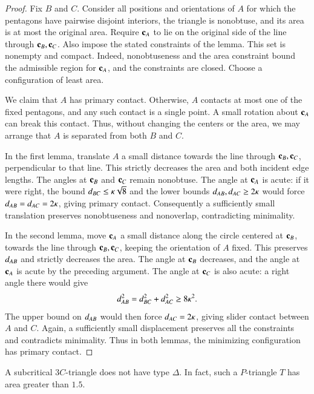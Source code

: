   \begin{proof}
Fix $B$ and $C$. Consider all positions and orientations of $A$
for which the pentagons have pairwise disjoint interiors, the
triangle is nonobtuse, and its area is at most the original area.
Require ${\mathbf c}_A$ to lie on the original side of the line through
${\mathbf c}_B,{\mathbf c}_C$. Also impose the stated constraints of the lemma.
This set is nonempty and compact. Indeed, nonobtuseness
and the area constraint bound the admissible region for ${\mathbf c}_A$,
and the constraints are closed. Choose a
configuration of least area.

We claim that $A$ has primary contact. Otherwise, $A$ contacts
at most one of the fixed pentagons, and any such contact is a
single point. A small rotation about ${\mathbf c}_A$ can break this
contact. Thus, without changing the centers or the area, we may arrange
that $A$ is separated from both $B$ and $C$.

In the first lemma, translate $A$ a small distance towards the
line through ${\mathbf c}_B,{\mathbf c}_C$, perpendicular to that line. This
strictly decreases the area and both incident edge lengths.
The angles at ${\mathbf c}_B$ and ${\mathbf c}_C$ remain nonobtuse. The angle at
${\mathbf c}_A$ is acute: if it were right, the bound
$d_{BC}\le\kappa\sqrt8$ and the lower bounds
$d_{AB},d_{AC}\ge2\kappa$ would force
$d_{AB}=d_{AC}=2\kappa$, giving primary contact.
Consequently a sufficiently small translation preserves
nonobtuseness and nonoverlap, contradicting minimality.

In the second lemma, move ${\mathbf c}_A$ a small distance along the
circle centered at ${\mathbf c}_B$, towards the line through
${\mathbf c}_B,{\mathbf c}_C$, keeping the orientation of $A$ fixed. This preserves
$d_{AB}$ and strictly decreases the area. The angle at ${\mathbf c}_B$
decreases, and the angle at ${\mathbf c}_A$ is acute by the preceding
argument. The angle at ${\mathbf c}_C$ is also acute: a right angle there
would give
\[
d_{AB}^2=d_{BC}^2+d_{AC}^2\ge8\kappa^2.
\]
The upper bound on $d_{AB}$ would then force
$d_{AC}=2\kappa$, giving slider contact between $A$ and $C$.
Again, a sufficiently small displacement preserves all the
constraints and contradicts minimality.
Thus in both lemmas, the minimizing configuration has primary contact.
\end{proof}

\begin{lemma} 
  A subcritical $3C$-triangle does not have type $\Delta$.  In fact,
  such a $P$-triangle $T$ has area greater than $1.5$.
\end{lemma}

